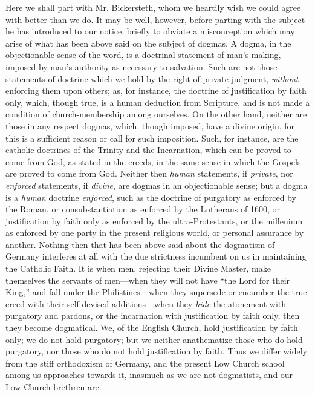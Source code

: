 Here we shall part with Mr. Bickersteth, whom we
heartily wish we could agree with better than we do. It may be well,
however, before parting with the subject he has introduced to our
notice, briefly to obviate a misconception which may arise of what has
been above said on the subject of dogmas. A dogma, in the objectionable
sense of the word, is a doctrinal statement of man's making, imposed by
man's authority as necessary to salvation. Such are not those statements
of doctrine which we hold by the right of private judgment, \emph{without}
enforcing them upon others; as, for instance, the doctrine of
justification by faith only, which, though true, is a human deduction
from Scripture, and is not made a condition of church-membership among
ourselves. On the other hand, neither are those in any respect dogmas,
which, though imposed, have a divine origin, for this is a sufficient
reason or call for such imposition. Such, for instance, are the catholic
doctrines of the Trinity and the Incarnation, which can be proved to
come from God, as stated in the creeds, in the same sense in which the
Gospels are proved to come from God. Neither then \emph{human}
statements, if \emph{private}, nor \emph{enforced} statements, if \emph{divine},
are dogmas in an objectionable sense; but a dogma is a \emph{human}
doctrine \emph{enforced}, such as the doctrine of purgatory as enforced
by the Roman, or consubstantiation as enforced by the Lutherans of 1600,
or justification by faith only as enforced by the ultra-Protestants, or
the millenium as enforced by one party in the present religious world,
or personal assurance by another. Nothing then that has been above said
about the dogmatism of Germany interferes at all with the due strictness
incumbent on us in maintaining the Catholic Faith. It is when men,
rejecting their Divine Master, make themselves the servants of
men—when they will not have ``the Lord for their King,'' and fall under
the Philistines—when they supersede or encumber the true creed with
their self-devised additions—when they \emph{hide} the atonement with
purgatory and pardons, or the incarnation with justification by faith
only, then they become dogmatical. We, of the English Church, hold
justification by faith only; we do not hold purgatory; but we neither
anathematize those who do hold purgatory, nor those who do not hold
justification by faith. Thus we differ widely from the stiff
orthodoxism of Germany, and the present Low Church school among us
approaches towards it, inasmuch as we are not dogmatists, and our Low
Church brethren are.

